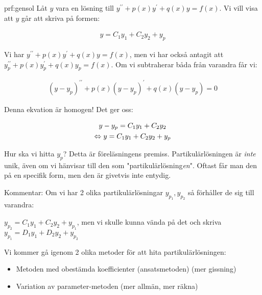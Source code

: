 \begin{prf}{prf:gensol}
  Låt $y$ vara en lösning till $y^{\prime\prime}+p(x)y^{\prime}+q(x)y=f(x)$. Vi vill visa att $y$ går att skriva på formen:

  \begin{equation*}
    \begin{gathered}
      y = C_1y_1+C_2y_2 +y_p
    \end{gathered}
  \end{equation*}
  \par\bigskip
  \noindent Vi har $y^{\prime\prime}+p(x)y^{\prime}+q(x)y=f(x)$, men vi har också antagit att $y_p^{\prime\prime}+p(x)y_p^{\prime}+q(x)y_p = f(x)$. Om vi subtraherar båda från varandra får vi:


  \begin{equation*}
    \begin{gathered}
      (y-y_p)^{\prime\prime}+p(x)(y-y_p)^{\prime}+q(x)(y-y_p)=0
    \end{gathered}
  \end{equation*}
  \par\bigskip
  \noindent Denna ekvation är homogen! Det ger oss:


  \begin{equation*}
    \begin{gathered}
      y-y_p = C_1y_1+C_2y_2\\
      \Leftrightarrow y=C_1y_1+C_2y_2+y_p
    \end{gathered}
  \end{equation*}
\end{prf}
\par\bigskip
\noindent Hur ska vi hitta $y_p$? Detta är föreläsningens premiss. Partikulärlösningen är \textit{inte} unik, även om vi hänvisar till den som "partikulärlösning\textit{en}". Oftast får man den på en specifik form, men den är givetvis inte entydig.
\par\bigskip
\noindent Kommentar: Om vi har 2 olika partikulärlösningar $y_{p_1}, y_{p_2}$ så förhåller de sig till varandra:\par\noindent $y_{p_2} = C_1y_1+C_2y_2+y_{p_1}$, men vi skulle kunna vända på det och skriva $y_{p_1}=D_1y_1+D_2y_2+y_{p_2}$
\par\bigskip
\noindent Vi kommer gå igenom 2 olika metoder för att hita partikulärlösningen:

\begin{itemize}
  \item Metoden med obestämda koefficienter (ansatsmetoden) (mer gissning)
  \item Variation av parameter-metoden (mer allmän, mer räkna)
\end{itemize}
\par\bigskip

